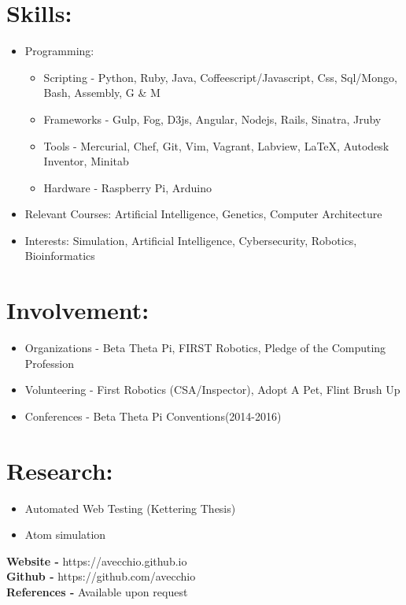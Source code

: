 \documentclass{res}
\begin{document}
\section{Skills:}
\begin{itemize}[leftmargin=*]
\item Programming:
\begin{itemize}[label=$\circ$]
\item Scripting - Python, Ruby, Java, Coffeescript/Javascript, Css, Sql/Mongo, Bash, Assembly, G \& M
\item Frameworks - Gulp, Fog, D3js, Angular, Nodejs, Rails, Sinatra, Jruby
\item Tools - Mercurial, Chef, Git, Vim, Vagrant, Labview, \LaTeX, Autodesk Inventor, Minitab
\item Hardware - Raspberry Pi, Arduino
\end{itemize}
\item Relevant Courses: Artificial Intelligence, Genetics, Computer Architecture
\item Interests: Simulation, Artificial Intelligence, Cybersecurity, Robotics, Bioinformatics
\end{itemize}

\section{Involvement:}
\begin{itemize}[leftmargin=*]
\item Organizations - Beta Theta Pi, FIRST Robotics, Pledge of the Computing Profession
\item Volunteering - First Robotics (CSA/Inspector), Adopt A Pet, Flint Brush Up
\item Conferences - Beta Theta Pi Conventions(2014-2016)%
\end{itemize}

\section{Research:}
\begin{itemize}[leftmargin=*]
\item Automated Web Testing (Kettering Thesis)
\item Atom simulation
\end{itemize}

\begin{center}
\textbf{Website - }https://avecchio.github.io\\
\textbf{Github - }https://github.com/avecchio\\
\textbf{References - }Available upon request
\end{center}
\end{document}
